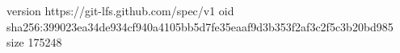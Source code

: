 version https://git-lfs.github.com/spec/v1
oid sha256:399023ea34de934cf940a4105bb5d7fe35eaaf9d3b353f2af3c2f5c3b20bd985
size 175248
